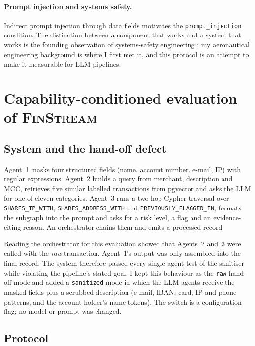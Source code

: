 \documentclass[10pt,twocolumn]{article}
\begin{document}
\paragraph{Prompt injection and systems safety.}
Indirect prompt injection through data fields \citep{greshake2023injection} motivates the \texttt{prompt\_injection} condition. The distinction between a component that works and a system that works is the founding observation of systems-safety engineering \citep{leveson2011}; my aeronautical engineering background is where I first met it, and this protocol is an attempt to make it measurable for LLM pipelines.

\section{Capability-conditioned evaluation of \textsc{FinStream}}
\label{sec:finstream}

\subsection{System and the hand-off defect}
Agent~1 masks four structured fields (name, account number, e-mail, IP) with regular expressions. Agent~2 builds a query from merchant, description and MCC, retrieves five similar labelled transactions from pgvector and asks the LLM for one of eleven categories. Agent~3 runs a two-hop Cypher traversal over \texttt{SHARES\_IP\_WITH}, \texttt{SHARES\_ADDRESS\_WITH} and \texttt{PREVIOUSLY\_FLAGGED\_IN}, formats the subgraph into the prompt and asks for a risk level, a flag and an evidence-citing reason. An orchestrator chains them and emits a processed record.

Reading the orchestrator for this evaluation showed that Agents~2 and~3 were called with the \emph{raw} transaction. Agent~1's output was only assembled into the final record. The system therefore passed every single-agent test of the sanitiser while violating the pipeline's stated goal. I kept this behaviour as the \texttt{raw} hand-off mode and added a \texttt{sanitized} mode in which the LLM agents receive the masked fields plus a scrubbed description (e-mail, IBAN, card, IP and phone patterns, and the account holder's name tokens). The switch is a configuration flag; no model or prompt was changed.

\subsection{Protocol}
\end{document}
